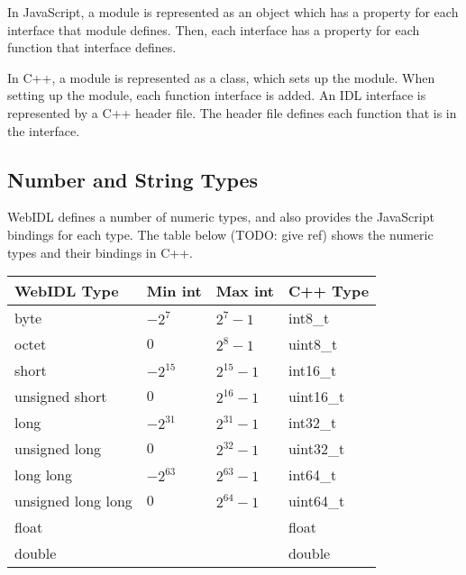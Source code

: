 In JavaScript, a module is represented as an object which has a property for each interface that module defines. Then, each interface has a property for each function that interface defines. 

In C++, a module is represented as a class, which sets up the module. When setting up the module, each function interface is added. An IDL interface is represented by a C++ header file. The header file defines each function that is in the interface.


\subsection{Number and String Types} %
\label{sub:number_types}
WebIDL defines a number of numeric types, and also provides the JavaScript bindings for each type. The table below (TODO: give ref) shows the numeric types and their bindings in C++.

\begin{table}[h]
\begin{tabular}{l|lll}
\textbf{WebIDL Type} & \textbf{Min int} & \textbf{Max int} & \textbf{C++ Type}  \\ \hline
byte                 & $-2^{7}$         & $2^{7}-1$        & int8\_t            \\
octet                & $0$              & $2^{8}-1$        & uint8\_t           \\
short                & $-2^{15}$        & $2^{15}-1$       & int16\_t           \\
unsigned short       & $0$              & $2^{16}-1$       & uint16\_t          \\
long                 & $-2^{31}$        & $2^{31}-1$       & int32\_t           \\
unsigned long        & $0$              & $2^{32}-1$       & uint32\_t          \\
long long            & $-2^{63}$        & $2^{63}-1$       & int64\_t           \\
unsigned long long   & $0$              & $2^{64}-1$       & uint64\_t          \\
float                &                  &                  & float              \\
double               &                  &                  & double           
\end{tabular}
\end{table}

